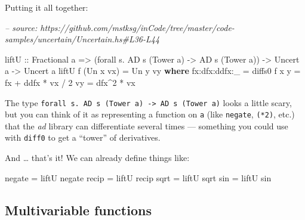 \documentclass[]{article}
\newenvironment{Shaded}{}{}
\newcommand{\CommentTok}[1]{\textcolor[rgb]{0.38,0.63,0.69}{\textit{#1}}}
\newcommand{\DataTypeTok}[1]{\textcolor[rgb]{0.56,0.13,0.00}{#1}}
\newcommand{\DecValTok}[1]{\textcolor[rgb]{0.25,0.63,0.44}{#1}}
\newcommand{\FunctionTok}[1]{\textcolor[rgb]{0.02,0.16,0.49}{#1}}
\newcommand{\KeywordTok}[1]{\textcolor[rgb]{0.00,0.44,0.13}{\textbf{#1}}}
\newcommand{\NormalTok}[1]{#1}
\newcommand{\OtherTok}[1]{\textcolor[rgb]{0.00,0.44,0.13}{#1}}
\begin{document}
Putting it all together:

\begin{Shaded}
\begin{Highlighting}[]
\CommentTok{-- source: https://github.com/mstksg/inCode/tree/master/code-samples/uncertain/Uncertain.hs#L36-L44}

\OtherTok{liftU ::} \DataTypeTok{Fractional}\NormalTok{ a}
      \OtherTok{=>}\NormalTok{ (forall s}\FunctionTok{.} \DataTypeTok{AD}\NormalTok{ s (}\DataTypeTok{Tower}\NormalTok{ a) }\OtherTok{->} \DataTypeTok{AD}\NormalTok{ s (}\DataTypeTok{Tower}\NormalTok{ a))}
      \OtherTok{->} \DataTypeTok{Uncert}\NormalTok{ a}
      \OtherTok{->} \DataTypeTok{Uncert}\NormalTok{ a}
\NormalTok{liftU f (}\DataTypeTok{Un}\NormalTok{ x vx) }\FunctionTok{=} \DataTypeTok{Un}\NormalTok{ y vy}
  \KeywordTok{where}
\NormalTok{    fx}\FunctionTok{:}\NormalTok{dfx}\FunctionTok{:}\NormalTok{ddfx}\FunctionTok{:}\NormalTok{_ }\FunctionTok{=}\NormalTok{ diffs0 f x}
\NormalTok{    y             }\FunctionTok{=}\NormalTok{ fx }\FunctionTok{+}\NormalTok{ ddfx }\FunctionTok{*}\NormalTok{ vx }\FunctionTok{/} \DecValTok{2}
\NormalTok{    vy            }\FunctionTok{=}\NormalTok{ dfx}\FunctionTok{^}\DecValTok{2} \FunctionTok{*}\NormalTok{ vx}
\end{Highlighting}
\end{Shaded}

The type
\texttt{forall\ s.\ AD\ s\ (Tower\ a)\ -\textgreater{}\ AD\ s\ (Tower\ a)} looks
a little scary, but you can think of it as representing a function on \texttt{a}
(like \texttt{negate}, \texttt{(*2)}, etc.) that the \emph{ad} library can
differentiate several times --- something you could use with \texttt{diff0} to
get a ``tower'' of derivatives.

And \ldots{} that's it! We can already define things like:

\begin{Shaded}
\begin{Highlighting}[]
\NormalTok{negate }\FunctionTok{=}\NormalTok{ liftU negate}
\NormalTok{recip  }\FunctionTok{=}\NormalTok{ liftU recip}
\NormalTok{sqrt   }\FunctionTok{=}\NormalTok{ liftU sqrt}
\NormalTok{sin    }\FunctionTok{=}\NormalTok{ liftU sin}
\end{Highlighting}
\end{Shaded}

\hypertarget{multivariable-functions}{%
\subsection{Multivariable functions}\label{multivariable-functions}}
\end{document}
